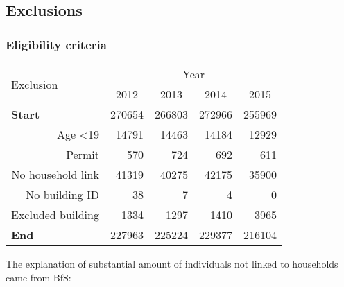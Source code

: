 \documentclass[a4paper, notitlepage, fleqn]{article} %
\begin{document}
\newpage
\subsection{Exclusions}

\subsubsection{Eligibility criteria}

\begin{table}[!htbp]
\centering
\begin{tabular}{rrrrr}
\hline
\multicolumn{1}{l}{\multirow{2}{*}{Exclusion}} & \multicolumn{4}{c}{Year}                                                                                  \\
\multicolumn{1}{l}{}                           & \multicolumn{1}{c}{2012} & \multicolumn{1}{c}{2013} & \multicolumn{1}{c}{2014} & \multicolumn{1}{c}{2015} \\
\hline
\multicolumn{1}{l}{\textbf{Start}}             & 270654               & 266803               & 272966               & 255969               \\
\quad Age \textless 19				           & 14791                 & 14463                 & 14184                 & 12929                 \\
\quad Permit      					           & 570                 & 724                 & 692                 & 611                 \\
\quad No household link				           & 41319                 & 40275                 & 42175                 & 35900                 \\
\quad No building ID 					       & 38                 & 7                 & 4                 & 0                 \\
\quad Excluded building 				       & 1334                 & 1297                 & 1410                 & 3965                 \\
\hline
\multicolumn{1}{l}{\textbf{End}}               & 227963                 & 225224                 & 229377                 & 216104                 \\
\hline
\end{tabular}
\end{table}

The explanation of substantial amount of individuals not linked to households came from BfS: \\
\end{document}
